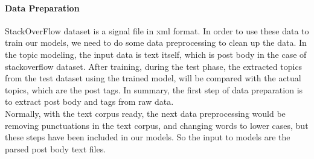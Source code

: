 \paragraph{Data Preparation} 
StackOverFlow dataset is a signal file in xml format. In order to use these data to train our models, we need to do some data preprocessing to clean up the data. In the topic modeling, the input data is text itself, which is post body in the case of stackoverflow dataset. After training, during the test phase, the extracted topics from the test dataset using the trained model, will be compared with the actual topics, which are the post tags. In summary, the first step of data preparation is to extract post body and tags from raw data.\\
Normally, with the text corpus ready, the next data preprocessing would be removing punctuations in the text corpus, and changing words to lower cases, but these steps have been included in our models. So the input to models are the parsed post body text files.


